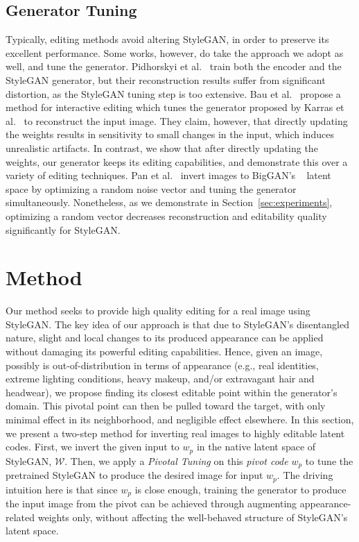 \subsection{Generator Tuning}

Typically, editing methods avoid altering StyleGAN, in order to preserve its excellent performance. Some works, however, do take the approach we adopt as well, and tune the generator. Pidhorskyi et al.~\cite{pidhorskyi2020adversarial} train both the encoder and the StyleGAN generator, but their reconstruction results suffer from significant distortion, as the StyleGAN tuning step is too extensive. Bau et al.~\cite{bau2020semantic} propose a method for interactive editing which tunes the generator proposed by Karras et al.~\cite{karras2017progressive} to reconstruct the input image. They claim, however, that directly updating the weights results in sensitivity to small changes in the input, which induces unrealistic artifacts. In contrast, we show that after directly updating the weights, our generator keeps its editing capabilities, and demonstrate this over a variety of editing techniques. Pan et al.~\cite{pan2020exploiting} invert images to BigGAN's ~\cite{brock2018large} latent space by optimizing a random noise vector and tuning the generator simultaneously. Nonetheless, as we demonstrate in Section~\ref{sec:experiments}, optimizing a random vector decreases reconstruction and editability quality significantly for StyleGAN. 

\section{Method}

Our method seeks to provide high quality editing for a real image using StyleGAN. The key idea of our approach is that due to StyleGAN's disentangled nature, slight and local changes to its produced appearance can be applied without damaging its powerful editing capabilities. Hence, given an image, possibly is out-of-distribution in terms of appearance (e.g., real identities, extreme lighting conditions, heavy makeup, and/or extravagant hair and headwear), we propose finding its closest editable point within the generator's domain. This pivotal point can then be pulled toward the target, with only minimal effect in its neighborhood, and negligible effect elsewhere. In this section, we present a two-step method for inverting real images to highly editable latent codes. First, we invert the given input to $w_p$ in the native latent space of StyleGAN, $\mathcal{W}$. Then, we apply a \textit{Pivotal Tuning} on this \textit{pivot code} $w_p$ to tune the pretrained StyleGAN to produce the desired image for input $w_p$. The driving intuition here is that since $w_p$ is close enough, training the generator to produce the input image from the pivot can be achieved through augmenting appearance-related weights only, without affecting the well-behaved structure of StyleGAN's latent space. 

